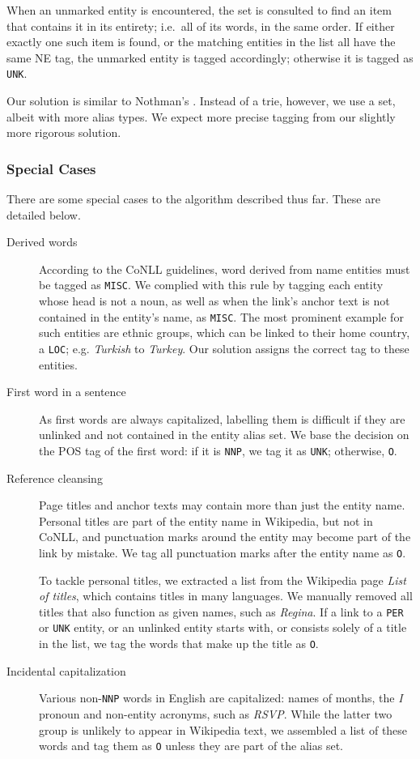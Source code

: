 \documentclass[11pt]{article}
\begin{document}
When an unmarked entity is encountered, the set is consulted to find an item that contains it in its entirety; i.e.~all of its words, in the same order. If either exactly one such item is found, or the matching entities in the list all have the same NE tag, the unmarked entity is tagged accordingly; otherwise it is tagged as \texttt{UNK}.

Our solution is similar to Nothman's . Instead of a trie, however, we use a set, albeit with more alias types. We expect more precise tagging from our slightly more rigorous solution.

\subsubsection{Special Cases}

There are some special cases to the algorithm described thus far. These are detailed below.

\begin{description}
\item[Derived words] According to the CoNLL guidelines, word derived from name entities must be tagged as \texttt{MISC}. We complied with this rule by tagging each entity whose head is not a noun, as well as when the link's anchor text is not contained in the entity's name, as \texttt{MISC}. The most prominent example for such entities are ethnic groups, which can be linked to their home country, a \texttt{LOC}; e.g. \textit{Turkish} to \textit{Turkey}. Our solution assigns the correct tag to these entities.
\item[First word in a sentence] As first words are always capitalized, labelling them is difficult if they are unlinked and not contained in the entity alias set. We base the decision on the POS tag of the first word: if it is \texttt{NNP}, we tag it as \texttt{UNK}; otherwise, \texttt{O}.
\item[Reference cleansing] Page titles and anchor texts may contain more than just the entity name. Personal titles are part of the entity name in Wikipedia, but not in CoNLL, and punctuation marks around the entity may become part of the link by mistake. We tag all punctuation marks after the entity name as \texttt{O}.

To tackle personal titles, we extracted a list from the Wikipedia page \textit{List of titles}, which contains titles in many languages. We manually removed all titles that also function as given names, such as \textit{Regina}. If a link to a \texttt{PER} or \texttt{UNK} entity, or an unlinked entity starts with, or consists solely of a title in the list, we tag the words that make up the title as \texttt{O}.
\item[Incidental capitalization] Various non-\texttt{NNP} words in English are capitalized: names of months, the \textit{I} pronoun and non-entity acronyms, such as \textit{RSVP}. While the latter two group is unlikely to appear in Wikipedia text, we assembled a list of these words and tag them as \texttt{O} unless they are part of the alias set.
\end{description}
\end{document}
